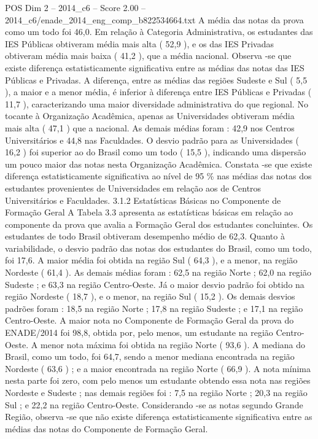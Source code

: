 \begin{textsample}{POS Dim 2 – 2014\_c6 – Score 2.00 – 2014\_c6/enade\_2014\_eng\_comp\_b822534664.txt}
A média das notas da prova como um todo foi 46,0.
Em relação à Categoria Administrativa, os estudantes das IES Públicas obtiveram média mais alta ( 52,9 ), e os das IES Privadas obtiveram média mais baixa ( 41,2 ), que a média nacional.
Observa -se que existe diferença estatisticamente significativa entre as médias das notas das IES Públicas e Privadas.
A diferença, entre as médias das regiões Sudeste e Sul ( 5,5 ), a maior e a menor média, é inferior à diferença entre IES Públicas e Privadas ( 11,7 ), caracterizando uma maior diversidade administrativa do que regional.
No tocante à Organização Acadêmica, apenas as Universidades obtiveram média mais alta ( 47,1 ) que a nacional.
As demais médias foram : 42,9 nos Centros Universitários e 44,8 nas Faculdades.
O desvio padrão para as Universidades ( 16,2 ) foi superior ao do Brasil como um todo ( 15,5 ), indicando uma dispersão um pouco maior das notas nesta Organização Acadêmica.
Constata -se que existe diferença estatisticamente significativa ao nível de 95 \% nas médias das notas dos estudantes provenientes de Universidades em relação aos de Centros Universitários e Faculdades. 3.1.2 Estatísticas Básicas no Componente de Formação Geral A Tabela 3.3 apresenta as estatísticas básicas em relação ao componente da prova que avalia a Formação Geral dos estudantes concluintes.
Os estudantes de todo Brasil obtiveram desempenho médio de 62,3.
Quanto à variabilidade, o desvio padrão das notas dos estudantes do Brasil, como um todo, foi 17,6.
A maior média foi obtida na região Sul ( 64,3 ), e a menor, na região Nordeste ( 61,4 ).
As demais médias foram : 62,5 na região Norte ; 62,0 na região Sudeste ; e 63,3 na região Centro-Oeste.
Já o maior desvio padrão foi obtido na região Nordeste ( 18,7 ), e o menor, na região Sul ( 15,2 ).
Os demais desvios padrões foram : 18,5 na região Norte ; 17,8 na região Sudeste ; e 17,1 na região Centro-Oeste.
A maior nota no Componente de Formação Geral da prova do ENADE/2014 foi 98,8, obtida por, pelo menos, um estudante na região Centro-Oeste.
A menor nota máxima foi obtida na região Norte ( 93,6 ).
A mediana do Brasil, como um todo, foi 64,7, sendo a menor mediana encontrada na região Nordeste ( 63,6 ) ; e a maior encontrada na região Norte ( 66,9 ).
A nota mínima nesta parte foi zero, com pelo menos um estudante obtendo essa nota nas regiões Nordeste e Sudeste ; nas demais regiões foi : 7,5 na região Norte ; 20,3 na região Sul ; e 22,2 na região Centro-Oeste.
Considerando -se as notas segundo Grande Região, observa -se que não existe diferença estatisticamente significativa entre as médias das notas do Componente de Formação Geral.

\end{textsample}
